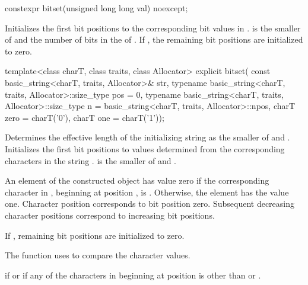 %
\begin{itemdecl}
constexpr bitset(unsigned long long val) noexcept;
\end{itemdecl}

\begin{itemdescr}
\pnum
\effects
Initializes the first  bit positions to the corresponding bit
values in .
 is the smaller of  and the number of bits in the
 of .
If , the remaining bit positions are initialized to zero.
\end{itemdescr}

%
\begin{itemdecl}
template<class charT, class traits, class Allocator>
  explicit bitset(
    const basic_string<charT, traits, Allocator>& str,
    typename basic_string<charT, traits, Allocator>::size_type pos = 0,
    typename basic_string<charT, traits, Allocator>::size_type n
      = basic_string<charT, traits, Allocator>::npos,
    charT zero = charT('0'),
    charT one = charT('1'));
\end{itemdecl}

\begin{itemdescr}
\pnum
\effects
Determines the effective length
 of the initializing string as the smaller of
 and
.
Initializes the first  bit
positions to values determined from the corresponding characters in the string
.
 is the smaller of  and .

\pnum
An element of the constructed object has value zero if the
corresponding character in , beginning at position
, is
.
Otherwise, the element has the value one.
Character position  corresponds to bit position zero.
Subsequent decreasing character positions correspond to increasing bit positions.

\pnum
If , remaining bit positions are initialized to zero.

\pnum
The function uses 
to compare the character values.

\pnum
\throws
{}%
 if  or
%
 if any of
the  characters in 
beginning at position 
is other than  or .
\end{itemdescr}

